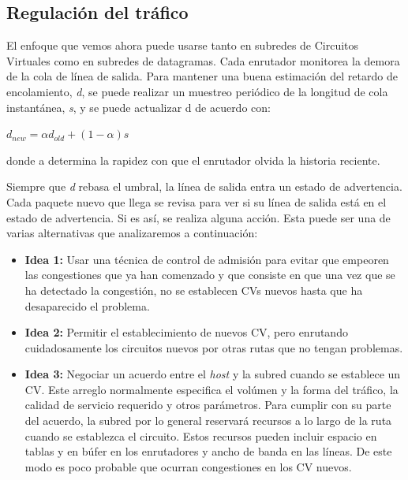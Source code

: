 \documentclass[10pt,a4paper]{report}
\begin{document}
\subsection{Regulación del tráfico}

	\par El enfoque que vemos ahora puede usarse tanto en subredes de Circuitos Virtuales como en subredes de datagramas. Cada enrutador monitorea la demora de la cola de línea de salida. Para mantener una buena estimación del retardo de encolamiento, \textit{d}, se puede realizar un muestreo periódico de la longitud de cola instantánea, \textit{s}, y se puede actualizar d de acuerdo con:

	\begin{center}
		$ d_{new} = \alpha d_{old} + (1-\alpha) s $
	\end{center}

	\par donde a determina la rapidez con que el enrutador olvida la historia reciente.

	\par Siempre que \textit{d} rebasa el umbral, la línea de salida entra un estado de advertencia. Cada paquete nuevo que llega se revisa para ver si su línea de salida está en el estado de advertencia. Si es así, se realiza alguna acción. Esta puede ser una de varias alternativas que analizaremos a continuación:

	\begin{itemize}
		\item \textbf{Idea 1:} Usar una técnica de control de admisión para evitar que empeoren las congestiones que ya han comenzado y que consiste en que una vez que se ha detectado la congestión, no se establecen CVs nuevos hasta que ha desaparecido el problema.
		\item \textbf{Idea 2:} Permitir el establecimiento de nuevos CV, pero enrutando cuidadosamente los circuitos nuevos por otras rutas que no tengan problemas.

		\item \textbf{Idea 3:} Negociar un acuerdo entre el \textit{host} y la subred cuando se establece un CV. Este arreglo normalmente especifica el volúmen y la forma del tráfico, la calidad de servicio requerido y otros parámetros. Para cumplir con su parte del acuerdo, la subred por lo general reservará recursos a lo largo de la ruta cuando se establezca el circuito. Estos recursos pueden incluir espacio en tablas y en búfer en los enrutadores y ancho de banda en las líneas. De este modo es poco probable que ocurran congestiones en los CV nuevos.
	\end{itemize}
\end{document}
